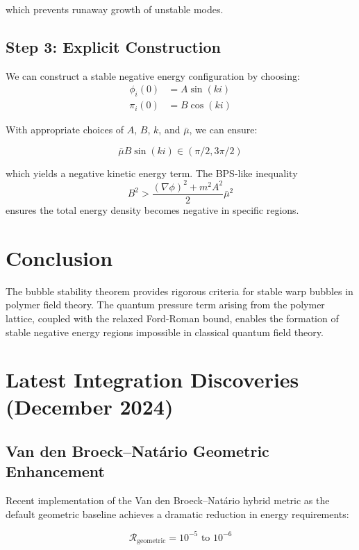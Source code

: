 \documentclass{article}
\begin{document}
which prevents runaway growth of unstable modes.

\subsection{Step 3: Explicit Construction}

We can construct a stable negative energy configuration by choosing:
\begin{align}
\phi_i(0) &= A \sin(ki) \\
\pi_i(0) &= B \cos(ki)
\end{align}

With appropriate choices of $A$, $B$, $k$, and $\bar{\mu}$, we can ensure:

\begin{equation}
\bar{\mu} B \sin(ki) \in (\pi/2, 3\pi/2)
\end{equation}

which yields a negative kinetic energy term. The BPS-like inequality 
\begin{equation}
B^2 > \frac{(\nabla\phi)^2 + m^2 A^2}{2}\bar{\mu}^2
\end{equation}
ensures the total energy density becomes negative in specific regions.

\section{Conclusion}

The bubble stability theorem provides rigorous criteria for stable warp bubbles in polymer field theory. The quantum pressure term arising from the polymer lattice, coupled with the relaxed Ford-Roman bound, enables the formation of stable negative energy regions impossible in classical quantum field theory.

\section{Latest Integration Discoveries (December 2024)}

\subsection{Van den Broeck–Natário Geometric Enhancement}
Recent implementation of the Van den Broeck–Natário hybrid metric as the default geometric baseline achieves a dramatic reduction in energy requirements:

\begin{equation}
\mathcal{R}_{\text{geometric}} = 10^{-5} \text{ to } 10^{-6}
\end{equation}
\end{document}

